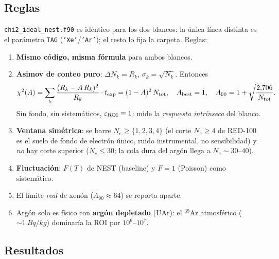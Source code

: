 \documentclass[11pt,a4paper]{article}
\newcommand{\Tnr}{T}
\newcommand{\Ne}{N_{e}}
\newcommand{\code}[1]{\texttt{#1}}
\begin{document}
\subsection{Reglas}

\code{chi2\_ideal\_nest.f90} es id\'entico para los dos blancos: la \'unica
l\'inea distinta es el par\'ametro \code{TAG} (\code{'Xe'}/\code{'Ar'}); el resto
lo fija la carpeta. Reglas:
\begin{enumerate}\itemsep2pt
  \item \textbf{Mismo c\'odigo, misma f\'ormula} para ambos blancos.
  \item \textbf{Asimov de conteo puro}: $\Delta N_{k}=R_{k}$,
    $\sigma_{k}=\sqrt{N_{k}}$. Entonces
    \begin{equation}
      \label{eq:chi2_asimov}
      \chi^{2}(A) = \sum_{k}\frac{(R_{k} - A\,R_{k})^{2}}{R_{k}}\cdot t_{\rm exp}
                  = (1 - A)^{2}\,N_{\rm tot},
      \quad
      A_{\rm best}=1,
      \quad
      A_{90} = 1 + \sqrt{\frac{2{,}706}{N_{\rm tot}}}.
    \end{equation}
    Sin fondo, sin sistem\'aticos, $\varepsilon_{\rm ROI}\equiv 1$: mide la
    \emph{respuesta intr\'inseca} del blanco.
  \item \textbf{Ventana sim\'etrica}: se barre $\Ne\ge\{1,2,3,4\}$ (el corte
    $\Ne\ge 4$ de RED-100 es el suelo de fondo de electr\'on \'unico, ruido
    instrumental, no sensibilidad) y \emph{no} hay corte superior ($\Ne\le 30$;
    la cola dura del arg\'on llega a $\Ne\sim 30$--$40$).
  \item \textbf{Fluctuaci\'on}: $F(\Tnr)$ de NEST (baseline) y $F=1$ (Poisson)
    como sistem\'atico.
  \item El l\'imite \emph{real} de xen\'on ($A_{90}\approx 64$) se reporta
    aparte.
  \item Arg\'on solo es f\'isico con \textbf{arg\'on depletado} (UAr): el
    ${}^{39}$Ar atmosf\'erico ($\sim\SI{1}{Bq/kg}$) dominar\'ia la ROI por
    $10^{6}$--$10^{7}$.
\end{enumerate}

\subsection{Resultados}
\end{document}
